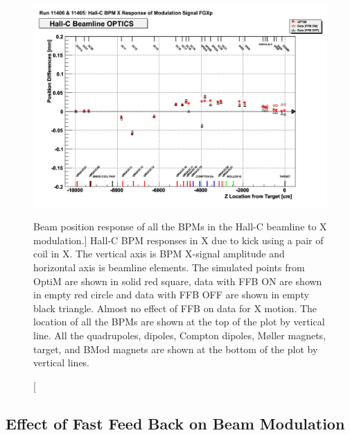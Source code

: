 \begin{singlespace}
\begin{figure}[!h]
	\begin{center}
	\includegraphics[width=15.0cm]{figures/BModOpticsFFBXXp}
	\end{center}
	\caption
	[Beam position response of all the BPMs in the Hall-C beamline to X modulation.]
	{Hall-C BPM responses in X due to kick using a pair of coil in X. The vertical axis is BPM X-signal amplitude and horizontal axis is beamline elements. The simulated points from OptiM are shown in solid red square, data with FFB ON are shown in empty red circle and data with FFB OFF are shown in empty black triangle. Almost no effect of FFB on data for X motion. The location of all the BPMs are shown at the top of the plot by vertical line. All the quadrupoles, dipoles, Compton dipoles, M{\o}ller magnets, target, and BMod magnets are shown at the bottom of the plot by vertical lines. }
	\label{fig:BModOpticsFFBXXp}
\end{figure}
\end{singlespace}



\subsection{Effect of Fast Feed Back on Beam Modulation}
\label{Effect of Fast Feed Back on Beam Modulation}

